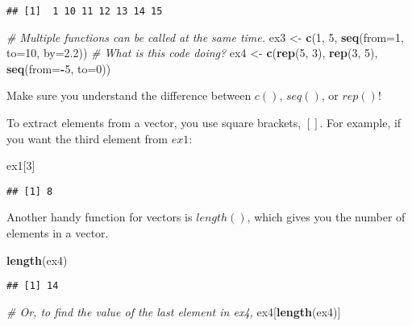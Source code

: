 \documentclass[]{article}
\newenvironment{Shaded}{\begin{snugshade}}{\end{snugshade}}
\newcommand{\CommentTok}[1]{\textcolor[rgb]{0.56,0.35,0.01}{\textit{#1}}}
\newcommand{\DataTypeTok}[1]{\textcolor[rgb]{0.13,0.29,0.53}{#1}}
\newcommand{\DecValTok}[1]{\textcolor[rgb]{0.00,0.00,0.81}{#1}}
\newcommand{\FloatTok}[1]{\textcolor[rgb]{0.00,0.00,0.81}{#1}}
\newcommand{\KeywordTok}[1]{\textcolor[rgb]{0.13,0.29,0.53}{\textbf{#1}}}
\newcommand{\NormalTok}[1]{#1}
\newcommand{\OperatorTok}[1]{\textcolor[rgb]{0.81,0.36,0.00}{\textbf{#1}}}
\newcommand{\StringTok}[1]{\textcolor[rgb]{0.31,0.60,0.02}{#1}}
\begin{document}
\begin{verbatim}
## [1]  1 10 11 12 13 14 15
\end{verbatim}

\begin{Shaded}
\begin{Highlighting}[]
\CommentTok{# Multiple functions can be called at the same time.}
\NormalTok{ex3 <-}\StringTok{ }\KeywordTok{c}\NormalTok{(}\DecValTok{1}\NormalTok{, }\DecValTok{5}\NormalTok{, }\KeywordTok{seq}\NormalTok{(}\DataTypeTok{from=}\DecValTok{1}\NormalTok{, }\DataTypeTok{to=}\DecValTok{10}\NormalTok{, }\DataTypeTok{by=}\FloatTok{2.2}\NormalTok{)) }\CommentTok{# What is this code doing?}
\NormalTok{ex4 <-}\StringTok{ }\KeywordTok{c}\NormalTok{(}\KeywordTok{rep}\NormalTok{(}\DecValTok{5}\NormalTok{, }\DecValTok{3}\NormalTok{), }\KeywordTok{rep}\NormalTok{(}\DecValTok{3}\NormalTok{, }\DecValTok{5}\NormalTok{), }\KeywordTok{seq}\NormalTok{(}\DataTypeTok{from=}\OperatorTok{-}\DecValTok{5}\NormalTok{, }\DataTypeTok{to=}\DecValTok{0}\NormalTok{))}
\end{Highlighting}
\end{Shaded}

Make sure you understand the difference between \(c()\), \(seq()\), or
\(rep()\)!

To extract elements from a vector, you use square brackets, \([]\). For
example, if you want the third element from \(ex1\):

\begin{Shaded}
\begin{Highlighting}[]
\NormalTok{ex1[}\DecValTok{3}\NormalTok{]}
\end{Highlighting}
\end{Shaded}

\begin{verbatim}
## [1] 8
\end{verbatim}

Another handy function for vectors is \(length()\), which gives you the
number of elements in a vector.

\begin{Shaded}
\begin{Highlighting}[]
\KeywordTok{length}\NormalTok{(ex4)}
\end{Highlighting}
\end{Shaded}

\begin{verbatim}
## [1] 14
\end{verbatim}

\begin{Shaded}
\begin{Highlighting}[]
\CommentTok{# Or, to find the value of the last element in ex4,}
\NormalTok{ex4[}\KeywordTok{length}\NormalTok{(ex4)]}
\end{Highlighting}
\end{Shaded}
\end{document}
